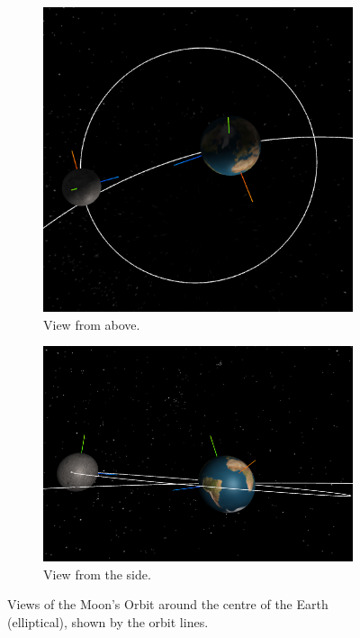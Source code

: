 \documentclass[12pt]{article}
\begin{document}
\begin{figure}[H]
        \centering
        \begin{subfigure}[b]{0.4\textwidth}
                \includegraphics[width=\textwidth]{images/moonorbitearth1}
                \caption{View from above.}
                \label{fig: The Moon orbiting the Earth.}
       \end{subfigure}
        \begin{subfigure}[b]{0.4\textwidth}
                \includegraphics[width=\textwidth]{images/moonorbitearth2}
                \caption{View from the side.}
                \label{fig:The Earth orbiting the Sun}
       \end{subfigure}
       \caption{Views of the Moon's Orbit around the centre of the Earth (elliptical), shown by the orbit lines.}\label{fig: The Moon orbiting the centre of the Earth}
\end{figure}
\end{document}
